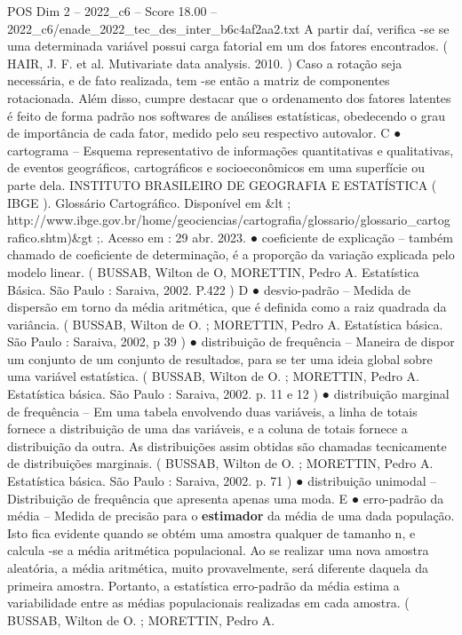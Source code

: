\begin{textsample}{POS Dim 2 – 2022\_c6 – Score 18.00 – 2022\_c6/enade\_2022\_tec\_des\_inter\_b6c4af2aa2.txt}
A partir daí, verifica -se se uma determinada variável possui carga fatorial em um dos fatores encontrados. ( HAIR, J.
F. et al.
Mutivariate data analysis. 2010. ) Caso a rotação seja necessária, e de fato realizada, tem -se então a matriz de componentes rotacionada.
Além disso, cumpre destacar que o ordenamento dos fatores latentes é feito de forma padrão nos softwares de análises estatísticas, obedecendo o grau de importância de cada fator, medido pelo seu respectivo autovalor.
C {\EmojiFont ●} cartograma – Esquema representativo de informações quantitativas e qualitativas, de eventos geográficos, cartográficos e socioeconômicos em uma superfície ou parte dela.
INSTITUTO BRASILEIRO DE GEOGRAFIA E ESTATÍSTICA ( IBGE ).
Glossário Cartográfico.
Disponível em \&lt ; http://www.ibge.gov.br/home/geociencias/cartografia/glossario/glossario\_cartografico.shtm)\&gt ;.
Acesso em : 29 abr. 2023. {\EmojiFont ●} coeficiente de explicação – também chamado de coeficiente de determinação, é a proporção da variação explicada pelo modelo linear. ( BUSSAB, Wilton de O, MORETTIN, Pedro A.
Estatística Básica.
São Paulo : Saraiva, 2002.
P.422 ) D {\EmojiFont ●} desvio-padrão – Medida de dispersão em torno da média aritmética, que é definida como a raiz quadrada da variância. ( BUSSAB, Wilton de O. ; MORETTIN, Pedro A.
Estatística básica.
São Paulo : Saraiva, 2002, p 39 ) {\EmojiFont ●} distribuição de frequência – Maneira de dispor um conjunto de um conjunto de resultados, para se ter uma ideia global sobre uma variável estatística. ( BUSSAB, Wilton de O. ; MORETTIN, Pedro A.
Estatística básica.
São Paulo : Saraiva, 2002. p. 11 e 12 ) {\EmojiFont ●} distribuição marginal de frequência – Em uma tabela envolvendo duas variáveis, a linha de totais fornece a distribuição de uma das variáveis, e a coluna de totais fornece a distribuição da outra.
As distribuições assim obtidas são chamadas tecnicamente de distribuições marginais. ( BUSSAB, Wilton de O. ; MORETTIN, Pedro A.
Estatística básica.
São Paulo : Saraiva, 2002. p. 71 ) {\EmojiFont ●} distribuição unimodal – Distribuição de frequência que apresenta apenas uma moda.
E {\EmojiFont ●} erro-padrão da média – Medida de precisão para o \textbf{estimador} da média de uma dada população.
Isto fica evidente quando se obtém uma amostra qualquer de tamanho n, e calcula -se a média aritmética populacional.
Ao se realizar uma nova amostra aleatória, a média aritmética, muito provavelmente, será diferente daquela da primeira amostra.
Portanto, a estatística erro-padrão da média estima a variabilidade entre as médias populacionais realizadas em cada amostra. ( BUSSAB, Wilton de O. ; MORETTIN, Pedro A.

\end{textsample}
